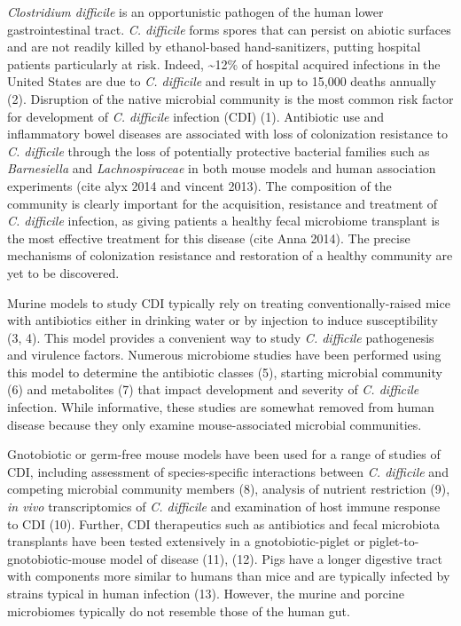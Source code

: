 \documentclass[11pt,]{article}
\begin{document}
\emph{Clostridium difficile} is an opportunistic pathogen of the human
lower gastrointestinal tract. \emph{C. difficile} forms spores that can
persist on abiotic surfaces and are not readily killed by ethanol-based
hand-sanitizers, putting hospital patients particularly at risk. Indeed,
\textasciitilde{}12\% of hospital acquired infections in the United
States are due to \emph{C. difficile} and result in up to 15,000 deaths
annually (2). Disruption of the native microbial community is the most
common risk factor for development of \emph{C. difficile} infection
(CDI) (1). Antibiotic use and inflammatory bowel diseases are associated
with loss of colonization resistance to \emph{C. difficile} through the
loss of potentially protective bacterial families such as
\emph{Barnesiella} and \emph{Lachnospiraceae} in both mouse models and
human association experiments (cite alyx 2014 and vincent 2013). The
composition of the community is clearly important for the acquisition,
resistance and treatment of \emph{C. difficile} infection, as giving
patients a healthy fecal microbiome transplant is the most effective
treatment for this disease (cite Anna 2014). The precise mechanisms of
colonization resistance and restoration of a healthy community are yet
to be discovered.

Murine models to study CDI typically rely on treating
conventionally-raised mice with antibiotics either in drinking water or
by injection to induce susceptibility (3, 4). This model provides a
convenient way to study \emph{C. difficile} pathogenesis and virulence
factors. Numerous microbiome studies have been performed using this
model to determine the antibiotic classes (5), starting microbial
community (6) and metabolites (7) that impact development and severity
of \emph{C. difficile} infection. While informative, these studies are
somewhat removed from human disease because they only examine
mouse-associated microbial communities.

Gnotobiotic or germ-free mouse models have been used for a range of
studies of CDI, including assessment of species-specific interactions
between \emph{C. difficile} and competing microbial community members
(8), analysis of nutrient restriction (9), \emph{in vivo}
transcriptomics of \emph{C. difficile} and examination of host immune
response to CDI (10). Further, CDI therapeutics such as antibiotics and
fecal microbiota transplants have been tested extensively in a
gnotobiotic-piglet or piglet-to-gnotobiotic-mouse model of disease (11),
(12). Pigs have a longer digestive tract with components more similar to
humans than mice and are typically infected by strains typical in human
infection (13). However, the murine and porcine microbiomes typically do
not resemble those of the human gut.
\end{document}
